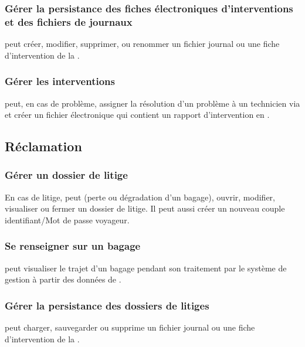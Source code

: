 \subsubsection{Gérer la persistance des fiches électroniques d'interventions et des fichiers de journaux}
 peut créer, modifier, supprimer, ou renommer un fichier journal ou une fiche d'intervention de la .

\subsubsection{Gérer les interventions}
 peut, en cas de problème, assigner la résolution d'un problème à un technicien via  et créer un fichier électronique qui contient un rapport d'intervention en .

\subsection{Réclamation}

\subsubsection{Gérer un dossier de litige}
En cas de litige,   peut (perte ou dégradation d'un bagage), ouvrir, modifier, visualiser ou fermer un dossier de litige. Il peut aussi créer un nouveau couple identifiant/Mot de passe voyageur.

\subsubsection	{Se renseigner sur un bagage}
 peut visualiser le trajet d'un bagage pendant son traitement par le système de gestion à partir des données de .

\subsubsection{Gérer la persistance des dossiers de litiges}
 peut charger, sauvegarder ou supprime un fichier journal ou une fiche d'intervention de la .

